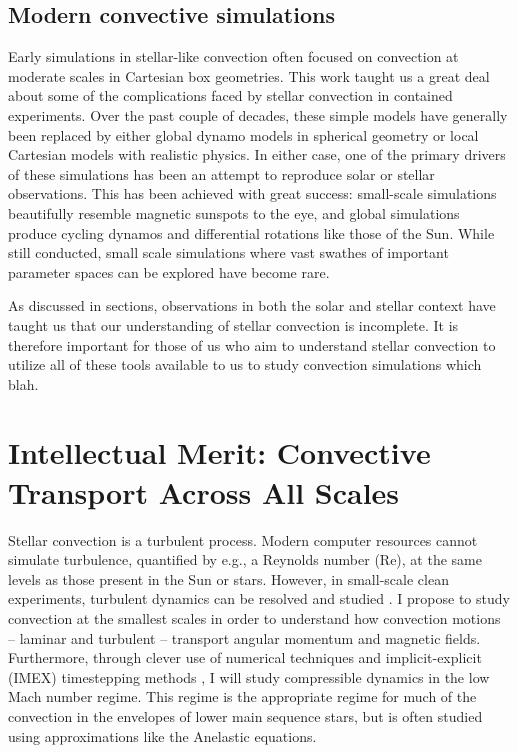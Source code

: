 \documentclass[aasms,12pt]{article}
\begin{document}
\subsection{Modern convective simulations}
Early simulations in stellar-like convection often focused on convection at moderate scales in Cartesian box geometries.
This work taught us a great deal about some of the complications faced by stellar convection in contained experiments.
Over the past couple of decades, these simple models have generally been replaced by either global dynamo models in spherical geometry or local Cartesian models with realistic physics.
In either case, one of the primary drivers of these simulations has been an attempt to reproduce solar or stellar observations.
This has been achieved with great success: small-scale simulations beautifully resemble magnetic sunspots to the eye, and global simulations produce cycling dynamos and differential rotations like those of the Sun.
While still conducted, small scale simulations where vast swathes of important parameter spaces can be explored have become rare.

As discussed in sections, observations in both the solar and stellar context have taught us that our understanding of stellar convection is incomplete.
It is therefore important for those of us who aim to understand stellar convection to utilize all of these tools available to us to study convection simulations which blah.

\section{Intellectual Merit: Convective Transport Across All Scales}
\label{sct:thermals}
Stellar convection is a turbulent process.
Modern computer resources cannot simulate turbulence, quantified by e.g., a Reynolds number (Re), at the same levels as those present in the Sun or stars.
However, in small-scale clean experiments, turbulent dynamics can be resolved and studied \citep[as in e.g.,][]{lecoanet&jeevanjee2019}.
I propose to study convection at the smallest scales in order to understand how convection motions -- laminar and turbulent -- transport angular momentum and magnetic fields.
Furthermore, through clever use of numerical techniques and implicit-explicit (IMEX) timestepping methods \citep{anders&brown2017}, I will study compressible dynamics in the low Mach number regime.
This regime is the appropriate regime for much of the convection in the envelopes of lower main sequence stars, but is often studied using approximations like the Anelastic equations.
\end{document}
